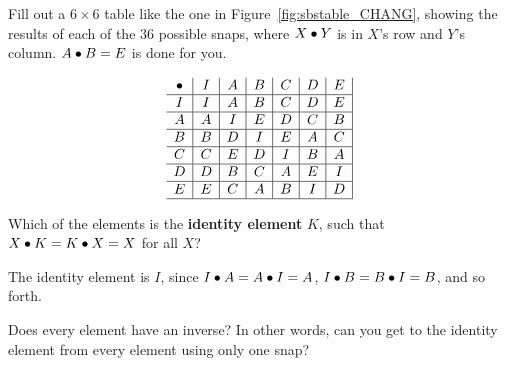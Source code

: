 \documentclass[../gatm_answers.tex]{subfiles}
\begin{document}
\begin{outer_problem}[start=1]
	\item Fill out a $6\times 6$ table like the one in Figure~\ref{fig:sbstable_CHANG}, showing the results of each of the $36$ possible snaps, where $X\bullet Y$ is in $X$'s row and $Y$'s column. $A\bullet B=E$ is done for you.
\end{outer_problem}

%
$$\begin{array}{c|c|c|c|c|c|c|}
\bullet & I & A & B & C & D & E \\ \hline
I & I & A & B & C & D & E \\ \hline
A & A & I & E & D & C & B \\ \hline
B & B & D & I & E & A & C \\ \hline
C & C & E & D & I & B & A \\ \hline
D & D & B & C & A & E & I \\ \hline
E & E & C & A & B & I & D \\ \hline
\end{array}$$

\begin{outer_problem}
	\item Which of the elements is the \textbf{identity element} $K$, such that $X\bullet K = K\bullet X = X$ for all $X$? \label{prob:group_definition_start}
\end{outer_problem}

The identity element is $I$, since $I\bullet A = A\bullet I = A$, $I\bullet B = B\bullet I = B$, and so forth.

\begin{outer_problem}
	\item Does every element have an inverse? In other words, can you get to the identity element from every element using only one snap?
\end{outer_problem}
\end{document}
